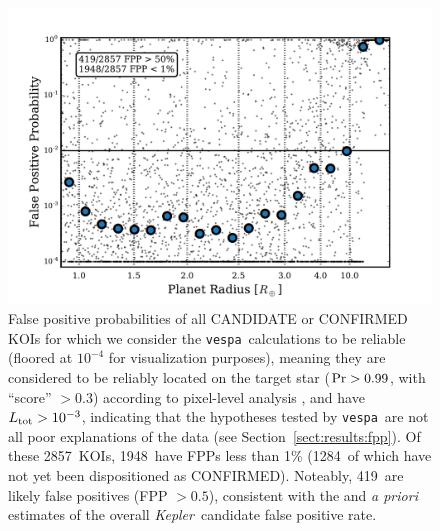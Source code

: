 \documentclass{emulateapj}
\newcommand{\figlabel}[1]{\label{fig:#1}}
\newcommand{\sectionname}{Section}
\newcommand{\Sect}[1]{\sectionname~\ref{sect:#1}}
\newcommand{\sect}[1]{\Sect{#1}}
\newcommand{\nreliable}{2857} %
\newcommand{\nval}{1948} %
\newcommand{\nreliableFP}{419} %
\newcommand{\nvalnew}{1284} %
\newcommand{\posprobthresh}{0.3}
\newcommand{\kepler}{\textit{Kepler}}
\newcommand{\vespa}{\texttt{vespa}}
\begin{document}
\begin{figure}[p]
\begin{center}
\includegraphics[width=7in]{figures/fpp_summary_all.pdf}
\end{center}
\caption{False positive probabilities of all CANDIDATE or CONFIRMED
  KOIs for which we consider the \vespa\ calculations to be reliable
  (floored at $10^{-4}$ for visualization purposes), meaning they are
  considered to be reliably located on the target star ($ {\rm Pr} >
  0.99$, with ``score'' $> \posprobthresh$) according to pixel-level analysis
  \citep{Bryson:KSCI}, and have $L_{\rm tot} > 10^{-3}$, indicating
  that the hypotheses tested by \vespa\ are not all poor explanations
  of the data (see \sect{results:fpp}).  Of these \nreliable\ KOIs,
  \nval\ have FPPs less than 1\% (\nvalnew\ of which have not yet been
  dispositioned as CONFIRMED).  Noteably, \nreliableFP\ are likely
  false positives (FPP $> 0.5$), consistent with the
  \citet{Morton:2011b} and \citet{Fressin:2013} \emph{a priori}
  estimates of the overall \kepler\ candidate false positive rate.
  \figlabel{fppall}}
\end{figure}
\end{document}
